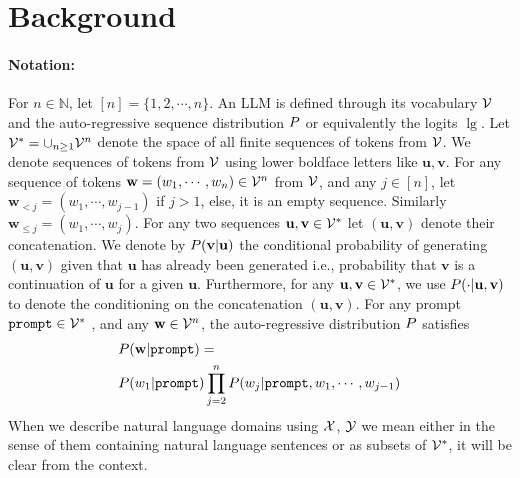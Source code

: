 \section{Background}
\label{sec:background}

\paragraph{Notation:} For $n\in\mathbb{N}$, let $[n]=\{1,2,\cdots,n\}$. An LLM is defined through its vocabulary $\mathcal{V}$ and the auto-regressive sequence distribution $P$ or equivalently the logits $\lg$. Let $\mathcal{V}^*=\cup_{n\geq 1}\mathcal{V}^n$ denote the space of all finite sequences of tokens from $\mathcal{V}$. We denote sequences of tokens from $\mathcal{V}$ using lower boldface letters like $\mathbf{u},\mathbf{v}$. For any sequence of tokens $\mathbf{w}=(w_1,\cdots,w_n)\in \mathcal{V}^n$ from $\mathcal{V}$, and any $j\in[n]$, let $\mathbf{w}_{<j}=(w_1,\cdots,w_{j-1})$ if $j>1$, else, it is an empty sequence. Similarly $\mathbf{w}_{\leq j}=(w_1,\cdots,w_j)$. For any two sequences $\mathbf{u},\mathbf{v}\in\mathcal{V}^*$ let $(\mathbf{u},\mathbf{v})$ denote their concatenation. We denote by $P(\mathbf{v}|\mathbf{u})$ the conditional probability of generating $(\mathbf{u},\mathbf{v})$ given that $\mathbf{u}$ has already been generated i.e., probability that $\mathbf{v}$ is a continuation of $\mathbf{u}$ for a given $\mathbf{u}$. Furthermore, for any $\mathbf{u},\mathbf{v}\in \mathcal{V}^*$, we use $P(\cdot|\mathbf{u},\mathbf{v})$ to denote the conditioning on the concatenation $(\mathbf{u},\mathbf{v})$. For any prompt $\mathtt{prompt}\in\mathcal{V}^*$ , and any $\mathbf{w}\in\mathcal{V}^n$, the auto-regressive distribution $P$ satisfies
\begin{align*}
    &P(\mathbf{w}|\mathtt{prompt})=\nonumber\\
    &P(w_1|\mathtt{prompt})\prod_{j=2}^{n}P(w_j|\mathtt{prompt},w_1,\cdots,w_{j-1})
\end{align*}
When we describe natural language domains using $\mathcal{X}$, $\mathcal{Y}$ we mean either in the sense of them containing natural language sentences or as subsets of $\mathcal{V}^*$, it will be clear from the context.%

